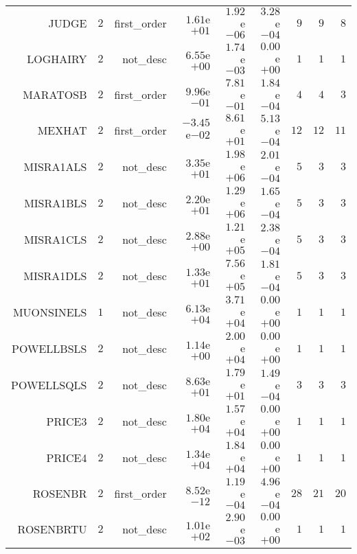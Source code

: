 \begin{longtable}{rrrrrrrrr}
JUDGE & \(     2\) & first\_order & \( 1.61\)e\(+01\) & \( 1.92\)e\(-06\) & \( 3.28\)e\(-04\) & \(     9\) & \(     9\) & \(     8\) \\
LOGHAIRY & \(     2\) & not\_desc & \( 6.55\)e\(+00\) & \( 1.74\)e\(-03\) & \( 0.00\)e\(+00\) & \(     1\) & \(     1\) & \(     1\) \\
MARATOSB & \(     2\) & first\_order & \( 9.96\)e\(-01\) & \( 7.81\)e\(-01\) & \( 1.84\)e\(-04\) & \(     4\) & \(     4\) & \(     3\) \\
MEXHAT & \(     2\) & first\_order & \(-3.45\)e\(-02\) & \( 8.61\)e\(+01\) & \( 5.13\)e\(-04\) & \(    12\) & \(    12\) & \(    11\) \\
MISRA1ALS & \(     2\) & not\_desc & \( 3.35\)e\(+01\) & \( 1.98\)e\(+06\) & \( 2.01\)e\(-04\) & \(     5\) & \(     3\) & \(     3\) \\
MISRA1BLS & \(     2\) & not\_desc & \( 2.20\)e\(+01\) & \( 1.29\)e\(+06\) & \( 1.65\)e\(-04\) & \(     5\) & \(     3\) & \(     3\) \\
MISRA1CLS & \(     2\) & not\_desc & \( 2.88\)e\(+00\) & \( 1.21\)e\(+05\) & \( 2.38\)e\(-04\) & \(     5\) & \(     3\) & \(     3\) \\
MISRA1DLS & \(     2\) & not\_desc & \( 1.33\)e\(+01\) & \( 7.56\)e\(+05\) & \( 1.81\)e\(-04\) & \(     5\) & \(     3\) & \(     3\) \\
MUONSINELS & \(     1\) & not\_desc & \( 6.13\)e\(+04\) & \( 3.71\)e\(+04\) & \( 0.00\)e\(+00\) & \(     1\) & \(     1\) & \(     1\) \\
POWELLBSLS & \(     2\) & not\_desc & \( 1.14\)e\(+00\) & \( 2.00\)e\(+04\) & \( 0.00\)e\(+00\) & \(     1\) & \(     1\) & \(     1\) \\
POWELLSQLS & \(     2\) & not\_desc & \( 8.63\)e\(+01\) & \( 1.79\)e\(+01\) & \( 1.49\)e\(-04\) & \(     3\) & \(     3\) & \(     3\) \\
PRICE3 & \(     2\) & not\_desc & \( 1.80\)e\(+04\) & \( 1.57\)e\(+04\) & \( 0.00\)e\(+00\) & \(     1\) & \(     1\) & \(     1\) \\
PRICE4 & \(     2\) & not\_desc & \( 1.34\)e\(+04\) & \( 1.84\)e\(+04\) & \( 0.00\)e\(+00\) & \(     1\) & \(     1\) & \(     1\) \\
ROSENBR & \(     2\) & first\_order & \( 8.52\)e\(-12\) & \( 1.19\)e\(-04\) & \( 4.96\)e\(-04\) & \(    28\) & \(    21\) & \(    20\) \\
ROSENBRTU & \(     2\) & not\_desc & \( 1.01\)e\(+02\) & \( 2.90\)e\(-03\) & \( 0.00\)e\(+00\) & \(     1\) & \(     1\) & \(     1\) \\

\end{longtable}
